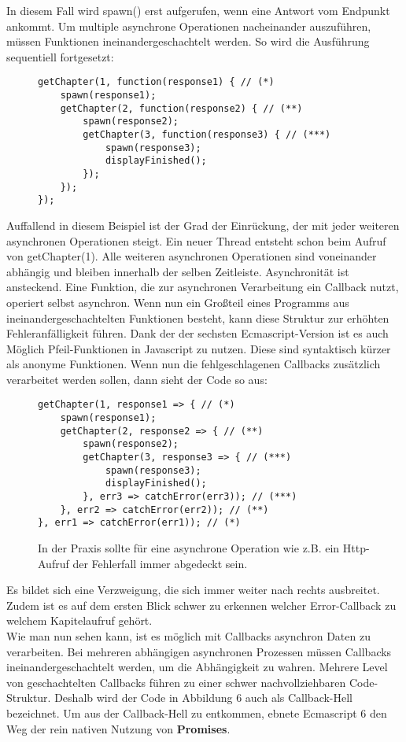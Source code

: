\noindent
In diesem Fall wird spawn() erst aufgerufen, wenn eine Antwort vom Endpunkt ankommt. Um multiple asynchrone Operationen nacheinander auszuführen, müssen Funktionen ineinandergeschachtelt werden. So wird die Ausführung sequentiell fortgesetzt:

\begin{figure}[H]
\begin{lstlisting}[basicstyle=\small]
getChapter(1, function(response1) { // (*)
    spawn(response1);
    getChapter(2, function(response2) { // (**)
        spawn(response2);
        getChapter(3, function(response3) { // (***)
            spawn(response3);
            displayFinished();
        });
    });
});
\end{lstlisting}
\end{figure}

\noindent
Auffallend in diesem Beispiel ist der Grad der Einrückung, der mit jeder weiteren asynchronen Operationen steigt. Ein neuer Thread entsteht schon beim Aufruf von getChapter(1). Alle weiteren asynchronen Operationen sind voneinander abhängig und bleiben innerhalb der selben Zeitleiste. Asynchronität ist ansteckend. Eine Funktion, die zur asynchronen Verarbeitung ein Callback nutzt, operiert selbst asynchron. Wenn nun ein Großteil eines Programms aus ineinandergeschachtelten Funktionen besteht, kann diese Struktur zur erhöhten Fehleranfälligkeit führen. Dank der der sechsten Ecmascript-Version ist es auch Möglich Pfeil-Funktionen in Javascript zu nutzen. Diese sind syntaktisch kürzer als anonyme Funktionen. Wenn nun die fehlgeschlagenen Callbacks zusätzlich verarbeitet werden sollen, dann sieht der Code so aus:

\begin{figure}[H]
\begin{lstlisting}[basicstyle=\small]
getChapter(1, response1 => { // (*)
    spawn(response1);
    getChapter(2, response2 => { // (**)
        spawn(response2);
        getChapter(3, response3 => { // (***)
            spawn(response3);
            displayFinished();
        }, err3 => catchError(err3)); // (***)
    }, err2 => catchError(err2)); // (**)
}, err1 => catchError(err1)); // (*)
\end{lstlisting}
\caption{In der Praxis sollte für eine asynchrone Operation wie z.B. ein Http-Aufruf der Fehlerfall immer abgedeckt sein.}
\end{figure}

\noindent
Es bildet sich eine Verzweigung, die sich immer weiter nach rechts ausbreitet. Zudem ist es auf dem ersten Blick schwer zu erkennen welcher Error-Callback zu welchem Kapitelaufruf gehört. \\

\noindent
Wie man nun sehen kann, ist es möglich mit Callbacks asynchron Daten zu verarbeiten. Bei mehreren abhängigen asynchronen Prozessen müssen Callbacks ineinandergeschachtelt werden, um die Abhängigkeit zu wahren. Mehrere Level von geschachtelten Callbacks führen zu einer schwer nachvollziehbaren Code-Struktur. Deshalb wird der Code in Abbildung 6 auch als Callback-Hell bezeichnet. Um aus der Callback-Hell zu entkommen, ebnete Ecmascript 6 den Weg der rein nativen Nutzung von \textbf{Promises}.



